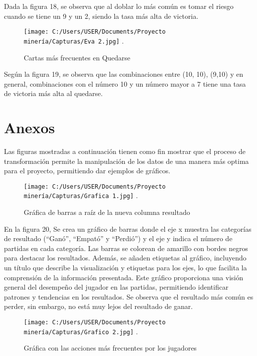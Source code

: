 \documentclass[conference,final,]{IEEEtran}
\begin{document}
Dada la figura 18, se observa que al doblar lo más común es tomar el
riesgo cuando se tiene un 9 y un 2, siendo la tasa más alta de victoria.

\begin{figure}[htbp]
\centering
\texttt{[image: C:/Users/USER/Documents/Proyecto minería/Capturas/Eva 2.jpg]}
\DeclareGraphicsExtensions.
\caption{Cartas más frecuentes en Quedarse}
\label{Evaluacion 2}
\end{figure}

Según la figura 19, se observa que las combinaciones entre (10, 10),
(9,10) y en general, combinaciones con el número 10 y un número mayor a
7 tiene una tasa de victoria más alta al quedarse.

\newpage

\section{Anexos}\label{anexos}

Las figuras mostradas a continuación tienen como fin mostrar que el
proceso de transformación permite la manipulación de los datos de una
manera más optima para el proyecto, permitiendo dar ejemplos de
gráficos.

\begin{figure}[htbp]
\centering
\texttt{[image: C:/Users/USER/Documents/Proyecto minería/Capturas/Grafica 1.jpg]}
\DeclareGraphicsExtensions.
\caption{Gráfica de barras a raíz de la nueva columna resultado}
\label{Dataset 8}
\end{figure}

En la figura 20, Se crea un gráfico de barras donde el eje x muestra las
categorías de resultado (``Ganó'', ``Empató'' y ``Perdió'') y el eje y
indica el número de partidas en cada categoría. Las barras se colorean
de amarillo con bordes negros para destacar los resultados. Además, se
añaden etiquetas al gráfico, incluyendo un título que describe la
visualización y etiquetas para los ejes, lo que facilita la comprensión
de la información presentada. Este gráfico proporciona una visión
general del desempeño del jugador en las partidas, permitiendo
identificar patrones y tendencias en los resultados. Se observa que el
resultado más común es perder, sin embargo, no está muy lejos del
resultado de ganar.

\begin{figure}[htbp]
\centering
\texttt{[image: C:/Users/USER/Documents/Proyecto minería/Capturas/Grafico 2.jpg]}
\DeclareGraphicsExtensions.
\caption{Gráfica con las acciones más frecuentes por los jugadores}
\label{Dataset 9}
\end{figure}
\end{document}

